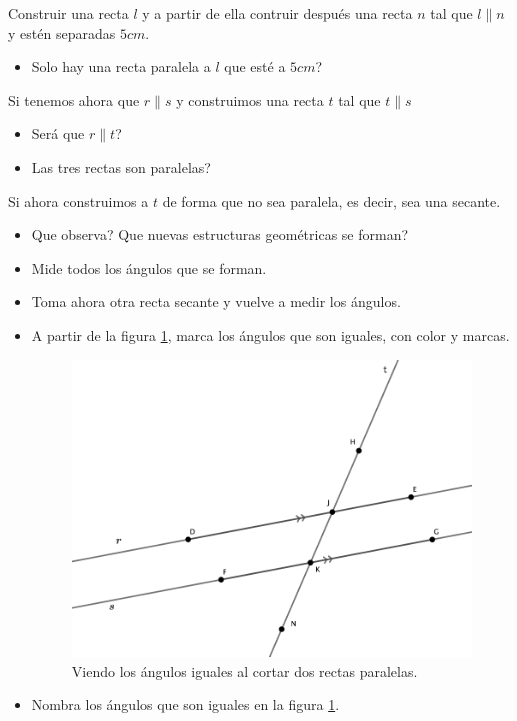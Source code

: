 \begin{exer}
	Construir una recta $l$ y a partir de ella contruir después una recta $n$ tal que $l\parallel n$ y estén separadas $5cm$. 
	\begin{itemize}
		\item Solo hay una recta paralela a $l$ que esté a $5cm$?
	\end{itemize}
\end{exer}

Si tenemos ahora que $r\parallel s$ y construimos una recta $t$ tal que $t\parallel s$
\begin{itemize}
	\item Será que $r\parallel t$?
	\item Las tres rectas son paralelas?
\end{itemize}

Si ahora construimos a $t$ de forma que no sea paralela, es decir, sea una secante.
\begin{itemize}
	\item Que observa? Que nuevas estructuras geométricas se forman?
	\item Mide todos los ángulos que se forman.
	\item Toma ahora otra recta secante y vuelve a medir los ángulos.
	\item A partir de la figura \ref{paralelas_angulos_iguales}, marca los ángulos que son iguales, con color y marcas.
	\begin{figure}[H]
		\centering
		\includegraphics[width=0.7\linewidth]{Geometria/imgs/paralelas_angulos_iguales}
		\caption{Viendo los ángulos iguales al cortar dos rectas paralelas.}
		\label{paralelas_angulos_iguales}
	\end{figure}
	\item Nombra los ángulos que son iguales en la figura \ref{paralelas_angulos_iguales}.
\end{itemize}


